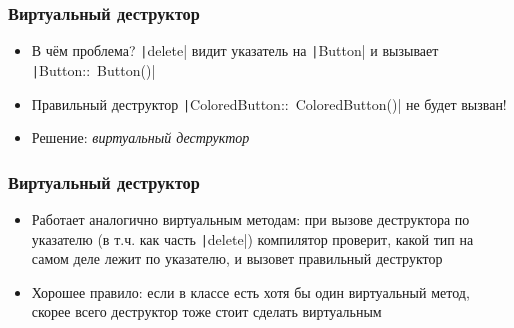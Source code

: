 \documentclass[10pt]{beamer}
\begin{document}
\begin{frame}[fragile]
\frametitle{Виртуальный деструктор}
\begin{itemize}
\begin{tcblisting}{listing engine=minted, minted language=cpp, minted options={fontsize=\scriptsize}, listing only, colback=codebg, colframe=codebg, rounded corners}
Button * buttons[3];
...
for (int i = 0; i < 3; ++i)
  delete buttons[i];
\end{tcblisting}
\item В чём проблема? \pause \texttt|delete| видит указатель на \texttt|Button| и вызывает \texttt|Button::~Button()|
\pause
\item Правильный деструктор \texttt|ColoredButton::~ColoredButton()| не будет вызван!
\pause
\item Решение: \textit{виртуальный деструктор}
\end{itemize}
\end{frame}

\begin{frame}[fragile]
\frametitle{Виртуальный деструктор}
\begin{itemize}
\begin{tcblisting}{listing engine=minted, minted language=cpp, minted options={fontsize=\scriptsize}, listing only, colback=codebg, colframe=codebg, rounded corners}
class Button {
public:
  virtual ~Button();
  ...
};
\end{tcblisting}
\pause
{}
\item Работает аналогично виртуальным методам: при вызове деструктора по указателю (в т.ч. как часть \texttt|delete|) компилятор проверит, какой тип на самом деле лежит по указателю, и вызовет правильный деструктор
\pause
\item Хорошее правило: если в классе есть хотя бы один виртуальный метод, скорее всего деструктор тоже стоит сделать виртуальным
\end{itemize}
\end{frame}
\end{document}
